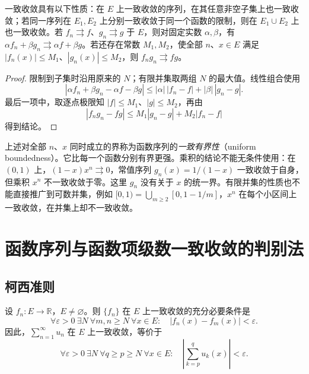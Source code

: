\documentclass[UTF8,12pt,a4paper,fontset=fandol]{ctexbook}
\begin{document}
\begin{proposition}
\label{prop:elementary-uniform-convergence-properties}
一致收敛具有以下性质：在 $E$ 上一致收敛的序列，在其任意非空子集上也一致收敛；若同一序列在 $E_1,E_2$ 上分别一致收敛于同一个函数的限制，则在 $E_1\cup E_2$ 上也一致收敛。若 $f_n\rightrightarrows f$、$g_n\rightrightarrows g$ 于 $E$，则对固定实数 $\alpha,\beta$，有 $\alpha f_n+\beta g_n\rightrightarrows\alpha f+\beta g$。若还存在常数 $M_1,M_2$，使全部 $n$、$x\in E$ 满足 $|f_n(x)|\leq M_1$、$|g_n(x)|\leq M_2$，则 $f_ng_n\rightrightarrows fg$。
\end{proposition}

\begin{proof}
限制到子集时沿用原来的 $N$；有限并集取两组 $N$ 的最大值。线性组合使用
\[
    |\alpha f_n+\beta g_n-\alpha f-\beta g|
    \leq|\alpha|\,|f_n-f|+|\beta|\,|g_n-g|.
\]
最后一项中，取逐点极限知 $|f|\leq M_1$、$|g|\leq M_2$，再由
\[
    |f_ng_n-fg|\leq M_1|g_n-g|+M_2|f_n-f|
\]
得到结论。
\end{proof}

上述对全部 $n$、$x$ 同时成立的界称为函数序列的\emph{一致有界性}（uniform boundedness）。它比每一个函数分别有界更强。乘积的结论不能无条件使用：在 $(0,1)$ 上，$(1-x)x^n\rightrightarrows0$，常值序列 $g_n(x)=1/(1-x)$ 一致收敛于自身，但乘积 $x^n$ 不一致收敛于零。这里 $g_n$ 没有关于 $x$ 的统一界。有限并集的性质也不能直接推广到可数并集，例如 $[0,1)=\bigcup_{m\geq2}[0,1-1/m]$，$x^n$ 在每个小区间上一致收敛，在并集上却不一致收敛。

\section{函数序列与函数项级数一致收敛的判别法}
\label{sec:uniform-convergence-tests}

\subsection{柯西准则}
\label{subsec:cauchy-criterion-for-uniform-convergence}

\begin{theorem}[一致收敛的柯西准则]
\label{thm:uniform-convergence-cauchy-criterion}
设 $f_n:E\to\mathbb R$，$E\neq\varnothing$。则 $\{f_n\}$ 在 $E$ 上一致收敛的充分必要条件是
\begin{equation}
    \forall\varepsilon>0\ \exists N\ \forall m,n\geq N
    \ \forall x\in E:\quad |f_n(x)-f_m(x)|<\varepsilon.
    \label{eq:uniform-cauchy-criterion}
\end{equation}
因此，$\sum_{n=1}^\infty u_n$ 在 $E$ 上一致收敛，等价于
\begin{equation}
    \forall\varepsilon>0\ \exists N\ \forall q\geq p\geq N
    \ \forall x\in E:\quad
    \left|\sum_{k=p}^q u_k(x)\right|<\varepsilon.
    \label{eq:uniform-series-cauchy-criterion}
\end{equation}
\end{theorem}
\end{document}

